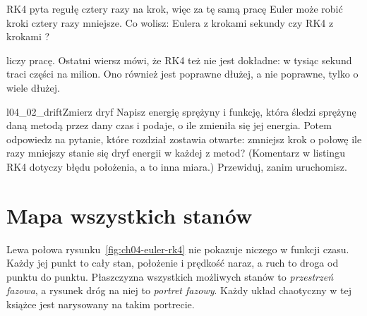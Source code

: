 \begin{think}
RK4 pyta regułę cztery razy na krok, więc za tę samą pracę Euler może robić
kroki cztery razy mniejsze. Co wolisz: Eulera z krokami 
sekundy czy RK4 z krokami ?
\end{think}



\noindent
{} liczy pracę. Ostatni wiersz mówi, że RK4 też nie jest
dokładne: w tysiąc sekund traci  części na
milion. Ono również jest poprawne dłużej, a nie poprawne, tylko o wiele
dłużej.

\begin{lab}{l04_02_drift}{Zmierz dryf}
Napisz energię sprężyny i funkcję, która śledzi sprężynę daną metodą przez
dany czas i podaje, o ile zmieniła się jej energia. Potem odpowiedz na
pytanie, które rozdział zostawia otwarte: zmniejsz krok o połowę \dash{} ile
razy mniejszy stanie się dryf energii w każdej z metod? (Komentarz w listingu
RK4 dotyczy błędu położenia, a to inna miara.) Przewiduj, zanim uruchomisz.
\end{lab}


\section{Mapa wszystkich stanów}
\label{sec:ch04-phase}

\noindent
Lewa połowa rysunku~\ref{fig:ch04-euler-rk4} nie pokazuje niczego w
funkcji czasu. Każdy jej punkt to cały stan, położenie i prędkość naraz, a
ruch to droga od punktu do punktu. Płaszczyzna wszystkich możliwych stanów to
\emph{przestrzeń fazowa}, a rysunek dróg na niej to \emph{portret fazowy}.
Każdy układ chaotyczny w tej książce jest narysowany na takim portrecie.

